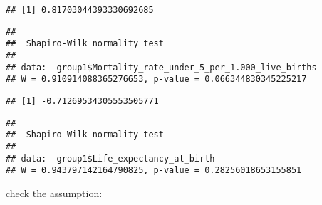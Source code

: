 \documentclass[
]{article}
\newenvironment{Shaded}{\begin{snugshade}}{\end{snugshade}}
\newcommand{\FloatTok}[1]{\textcolor[rgb]{0.00,0.00,0.81}{#1}}
\newcommand{\FunctionTok}[1]{\textcolor[rgb]{0.13,0.29,0.53}{\textbf{#1}}}
\newcommand{\NormalTok}[1]{#1}
\newcommand{\OtherTok}[1]{\textcolor[rgb]{0.56,0.35,0.01}{#1}}
\newcommand{\SpecialCharTok}[1]{\textcolor[rgb]{0.81,0.36,0.00}{\textbf{#1}}}
\begin{document}
\begin{verbatim}
## [1] 0.81703044393330692685
\end{verbatim}

\begin{Shaded}
\end{Shaded}

\begin{verbatim}
## 
##  Shapiro-Wilk normality test
## 
## data:  group1$Mortality_rate_under_5_per_1.000_live_births
## W = 0.910914088365276653, p-value = 0.066344830345225217
\end{verbatim}

\begin{Shaded}
\end{Shaded}

\begin{verbatim}
## [1] -0.71269534305553505771
\end{verbatim}

\begin{Shaded}
\end{Shaded}

\begin{verbatim}
## 
##  Shapiro-Wilk normality test
## 
## data:  group1$Life_expectancy_at_birth
## W = 0.943797142164790825, p-value = 0.28256018653155851
\end{verbatim}

check the assumption:

\begin{Shaded}
\end{Shaded}
\end{document}
